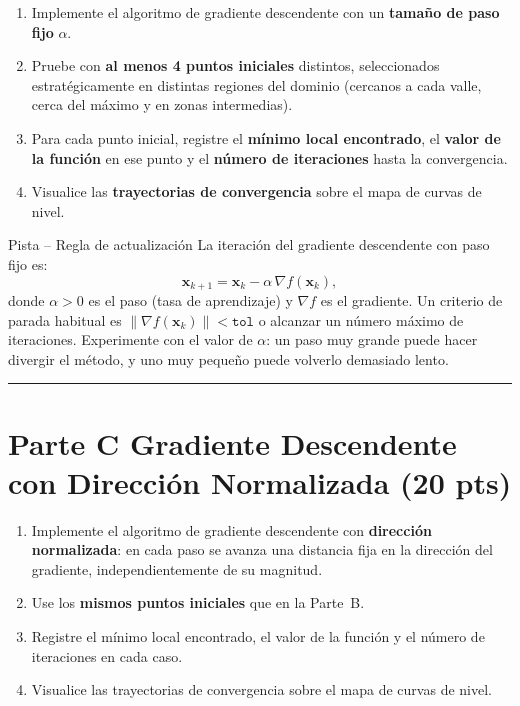 \documentclass[12pt,a4paper]{article}
\begin{document}
\begin{enumerate}[label=\alph*), leftmargin=*, topsep=2pt]
    \item Implemente el algoritmo de gradiente descendente con un
          \textbf{tamaño de paso fijo} $\alpha$.
    \item Pruebe con \textbf{al menos 4 puntos iniciales} distintos,
          seleccionados estratégicamente en distintas regiones del dominio
          (cercanos a cada valle, cerca del máximo y en zonas intermedias).
    \item Para cada punto inicial, registre el \textbf{mínimo local encontrado},
          el \textbf{valor de la función} en ese punto y el \textbf{número de
          iteraciones} hasta la convergencia.
    \item Visualice las \textbf{trayectorias de convergencia} sobre el mapa de
          curvas de nivel.
\end{enumerate}

\begin{ayuda}{Pista -- Regla de actualización}
\vspace{2pt}
La iteración del gradiente descendente con paso fijo es:
\[
    \mathbf{x}_{k+1} = \mathbf{x}_k - \alpha \,\nabla f(\mathbf{x}_k),
\]
donde $\alpha > 0$ es el paso (tasa de aprendizaje) y $\nabla f$ es el
gradiente. Un criterio de parada habitual es
$\lVert \nabla f(\mathbf{x}_k) \rVert < \texttt{tol}$ o alcanzar un número
máximo de iteraciones. Experimente con el valor de $\alpha$: un paso muy
grande puede hacer divergir el método, y uno muy pequeño puede volverlo
demasiado lento.
\end{ayuda}

\noindent\rule{\linewidth}{0.4pt}

\section*{Parte C \quad Gradiente Descendente con Dirección Normalizada \hfill\normalfont\normalsize(20 pts)}

\begin{enumerate}[label=\alph*), leftmargin=*, topsep=2pt]
    \item Implemente el algoritmo de gradiente descendente con
          \textbf{dirección normalizada}: en cada paso se avanza una distancia
          fija en la dirección del gradiente, independientemente de su
          magnitud.
    \item Use los \textbf{mismos puntos iniciales} que en la Parte~B.
    \item Registre el mínimo local encontrado, el valor de la función y el
          número de iteraciones en cada caso.
    \item Visualice las trayectorias de convergencia sobre el mapa de curvas
          de nivel.
\end{enumerate}
\end{document}
